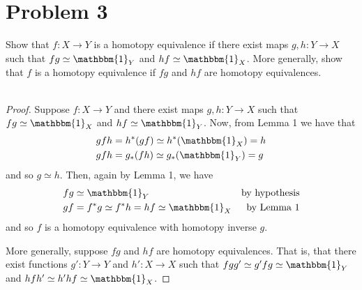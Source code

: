 \documentclass[fontsize=11pt]{scrartcl} %
\numberwithin{equation}{section} %
\numberwithin{figure}{section} %
\numberwithin{table}{section} %
\begin{document}
\section*{Problem 3} %
Show that $f:X\to Y$ is a homotopy equivalence if there exist maps $g,h:Y\to X$
such that $fg\simeq\mathbbm{1}_Y$ and $hf\simeq\mathbbm{1}_X$. More generally, show that
$f$ is a homotopy equivalence if $fg$ and $hf$ are homotopy equivalences.
\\
\\
\begin{proof}
    Suppose $f:X\to Y$ and there exist maps $g,h:Y\to X$ such that
    $fg\simeq\mathbbm{1}_X$ and $hf\simeq\mathbbm{1}_Y$.
    Now, from Lemma 1 we have that
    \[
        \begin{aligned}
            gfh &= h^*(gf) \simeq h^*(\mathbbm{1}_X) = h\\
            gfh &= g_*(fh) \simeq g_*(\mathbbm{1}_Y) = g
        \end{aligned}
    \]
    and so $g\simeq h$. Then, again by Lemma 1, we have
    \[
        \begin{aligned}
            fg &\simeq\mathbbm{1}_Y &\text{by hypothesis}\\
            gf &=f^*g \simeq f^*h = hf\simeq \mathbbm{1}_X &\text{by Lemma 1}
        \end{aligned}
    \]
    and so $f$ is a homotopy equivalence with homotopy inverse $g$.

    More generally, suppose $fg$ and $hf$ are homotopy equivalences. That is,
    that there exist functions $g':Y\to Y$ and $h':X\to X$ such that
    $fgg'\simeq g'fg\simeq \mathbbm{1}_Y$ and $hfh'\simeq h'hf\simeq
    \mathbbm{1}_X$.
\end{proof}
\end{document}

